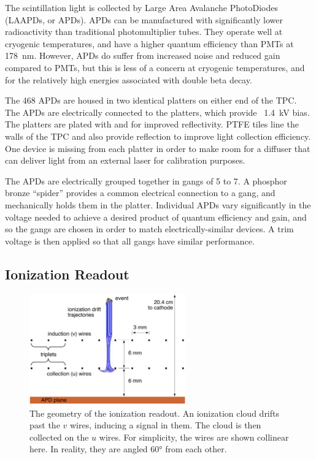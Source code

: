 \documentclass[herrin-thesis.tex]{subfiles}
\begin{document}
The scintillation light is collected by Large Area Avalanche PhotoDiodes (LAAPDs, or APDs). APDs can be manufactured with significantly lower radioactivity than traditional photomultiplier tubes. They operate well at cryogenic temperatures, and have a higher quantum efficiency than PMTs at \SI{178}{\nm}. However, APDs do suffer from increased noise and reduced gain compared to PMTs, but this is less of a concern at cryogenic temperatures, and for the relatively high energies associated with double beta decay.

The 468 APDs are housed in two identical platters on either end of the TPC. The APDs are electrically connected to the platters, which provide \about~\SI{1.4}{\kV} bias. The platters are plated with  and  for improved reflectivity. PTFE tiles line the walls of the TPC and also provide reflection to improve light collection efficiency. One device is missing from each platter in order to make room for a diffuser that can deliver light from an external laser for calibration purposes.

The APDs are electrically grouped together in gangs of 5 to 7. A phosphor bronze ``spider'' provides a common electrical connection to a gang, and mechanically holds them in the platter. Individual APDs vary significantly in the voltage needed to achieve a desired product of quantum efficiency and gain, and so the gangs are chosen in order to match electrically-similar devices\cite{Neilson:2009fk}. A trim voltage is then applied so that all gangs have similar performance.

\subsection{Ionization Readout}

\begin{figure}
\centering
\includegraphics[width=0.6\textwidth]{./figures/detector_wire_geometry.pdf}
\caption[Geometry of the ionization readout wire planes]{The geometry of the ionization readout. An ionization cloud drifts past the \(v\) wires, inducing a signal in them. The cloud is then collected on the \(u\) wires. For simplicity, the wires are shown collinear here. In reality, they are angled \ang{60} from each other.}
\label{fig:detector_wire_geometry}
\end{figure}
\end{document}
